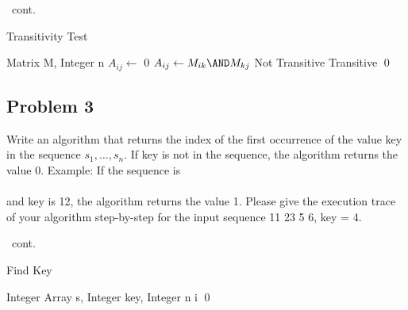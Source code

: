 \documentclass[handout]{beamer}
\begin{document}
        \begin{frame}[c,shrink]{\subsecname\ cont.}          
            \begin{algorithm}[H]
                \caption {Transitivity Test}
                \label{alg1}
                \begin{algorithmic}[1]
                    \REQUIRE Matrix M, Integer n
                    \STATE $A_{ij} \leftarrow$ 0
                    \STATE $A_{ij} \leftarrow M_{ik} \AND M_{kj}$
                    \ENDFOR
                    \PRINT Not Transitive
                    \RETURN
                    \ENDIF
                    \ENDFOR
                    \ENDFOR
                    \PRINT Transitive \qed
                \end{algorithmic}
            \end{algorithm}        
        \end{frame}



    \subsection{Problem 3}
    
        \begin{frame}[c]{\subsecname}
            Write an algorithm that returns the index of the first occurrence of the value key in the sequence $s_1,\ldots,s_n$. If key is not in the sequence, the algorithm returns the value 0. Example: If the sequence is \\ \\and key is 12, the algorithm returns the value 1. Please give the execution trace of your algorithm step-by-step for the input sequence 11 23 5 6, key = 4.
        \end{frame}
        
        \begin{frame}[c,shrink]{\subsecname\ cont.}          
            \begin{algorithm}[H]
                \caption {Find Key}
                \label{alg2}
                \begin{algorithmic}[1]
                    \REQUIRE Integer Array s, Integer key, Integer n
                    \RETURN i
                    \ENDIF
                    \ENDFOR
                     \qed
                \end{algorithmic}                
            \end{algorithm}        
        \end{frame}
        
\end{document}
